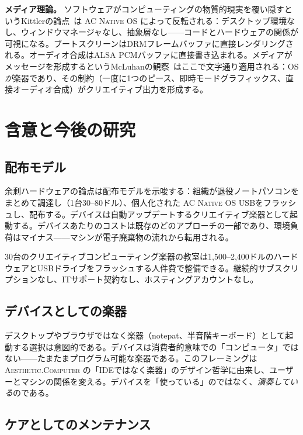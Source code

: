 \documentclass[10pt,letterpaper,twocolumn]{article}
\newcommand{\ac}{\textsc{Aesthetic.Computer}}
\newcommand{\acos}{\textsc{AC Native OS}}
\begin{document}
\textbf{メディア理論。} ソフトウェアがコンピューティングの物質的現実を覆い隠すというKittlerの論点~\citep{kittler1995no}は \acos{} によって反転される：デスクトップ環境なし、ウィンドウマネージャなし、抽象層なし——コードとハードウェアの関係が可視になる。ブートスクリーンはDRMフレームバッファに直接レンダリングされる。オーディオ合成はALSA PCMバッファに直接書き込まれる。メディアがメッセージを形成するというMcLuhanの観察~\citep{mcluhan1964understanding}はここで文字通り適用される：OS\emph{が}楽器であり、その制約（一度に1つのピース、即時モードグラフィックス、直接オーディオ合成）がクリエイティブ出力を形成する。


\section{含意と今後の研究}
\label{sec:implications}

\subsection{配布モデル}

余剰ハードウェアの論点は配布モデルを示唆する：組織が退役ノートパソコンをまとめて調達し（1台30--80ドル）、個人化された \acos{} USBをフラッシュし、配布する。デバイスは自動アップデートするクリエイティブ楽器として起動する。デバイスあたりのコストは既存のどのアプローチの一部であり、環境負荷はマイナス——マシンが電子廃棄物の流れから転用される。

30台のクリエイティブコンピューティング楽器の教室は1,500--2,400ドルのハードウェアとUSBドライブをフラッシュする人件費で整備できる。継続的サブスクリプションなし、ITサポート契約なし、ホスティングアカウントなし。

\subsection{デバイスとしての楽器}

デスクトップやブラウザではなく楽器（notepat、半音階キーボード）として起動する選択は意図的である。デバイスは消費者的意味での「コンピュータ」ではない——たまたまプログラム可能な楽器である。このフレーミングは \ac{} の「IDEではなく楽器」のデザイン哲学に由来し、ユーザーとマシンの関係を変える。デバイスを「使っている」のではなく、\emph{演奏している}のである。

\subsection{ケアとしてのメンテナンス}
\end{document}
